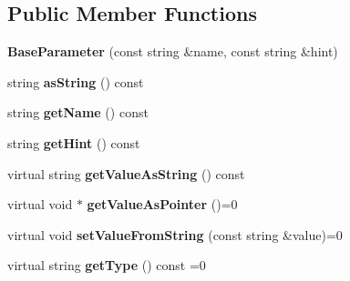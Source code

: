 \subsection*{Public Member Functions}
\begin{DoxyCompactItemize}
\item 
\hypertarget{classrr_1_1_base_parameter_a24b0fcc5742bb3437a999cb481453016}{{\bfseries Base\-Parameter} (const string \&name, const string \&hint)}\label{classrr_1_1_base_parameter_a24b0fcc5742bb3437a999cb481453016}

\item 
\hypertarget{classrr_1_1_base_parameter_a5da28fffef636ddb13de793d1cdd3816}{string {\bfseries as\-String} () const }\label{classrr_1_1_base_parameter_a5da28fffef636ddb13de793d1cdd3816}

\item 
\hypertarget{classrr_1_1_base_parameter_a03bd091e05c0b18ae0b54eeeab814705}{string {\bfseries get\-Name} () const }\label{classrr_1_1_base_parameter_a03bd091e05c0b18ae0b54eeeab814705}

\item 
\hypertarget{classrr_1_1_base_parameter_aa0006dc85b155913931f6a887ea096c7}{string {\bfseries get\-Hint} () const }\label{classrr_1_1_base_parameter_aa0006dc85b155913931f6a887ea096c7}

\item 
\hypertarget{classrr_1_1_base_parameter_a0aa7051c30953066dd7e480101b81f02}{virtual string {\bfseries get\-Value\-As\-String} () const }\label{classrr_1_1_base_parameter_a0aa7051c30953066dd7e480101b81f02}

\item 
\hypertarget{classrr_1_1_base_parameter_af87d38e25d9d7f7b68c351567848c5d2}{virtual void $\ast$ {\bfseries get\-Value\-As\-Pointer} ()=0}\label{classrr_1_1_base_parameter_af87d38e25d9d7f7b68c351567848c5d2}

\item 
\hypertarget{classrr_1_1_base_parameter_a7ea2078990b36be726f696902f45e09d}{virtual void {\bfseries set\-Value\-From\-String} (const string \&value)=0}\label{classrr_1_1_base_parameter_a7ea2078990b36be726f696902f45e09d}

\item 
\hypertarget{classrr_1_1_base_parameter_aa76987ca0c74ff28e67df3466e8a8310}{virtual string {\bfseries get\-Type} () const =0}\label{classrr_1_1_base_parameter_aa76987ca0c74ff28e67df3466e8a8310}

\end{DoxyCompactItemize}
